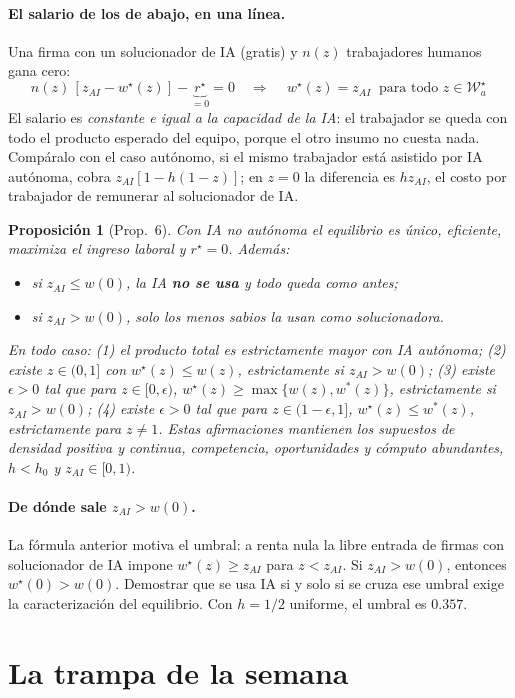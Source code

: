 \documentclass[11pt]{article}
\newtheorem{proposicion}{Proposición}
\theoremstyle{definition}
\theoremstyle{remark}
\newcommand{\zai}{z_{AI}}
\newcommand{\W}{\mathcal W}
\begin{document}
\paragraph{El salario de los de abajo, en una línea.} Una firma con un solucionador de IA (gratis) y
$n(z)$ trabajadores humanos gana cero:
\[
  n(z)\,[\zai-w^{\star}(z)]-\underbrace{r^{\star}}_{=0}=0\quad\Longrightarrow\quad
  \boxed{\,w^{\star}(z)=\zai\ \text{ para todo } z\in\W_a^{\star}\,}
\]
El salario es \emph{constante e igual a la capacidad de la IA}: el trabajador se queda con todo el
producto esperado del equipo, porque el otro insumo no cuesta nada. Compáralo con el caso autónomo,
si el mismo trabajador está asistido por IA autónoma, cobra $\zai[1-h(1-z)]$; en $z=0$ la diferencia
es $h\zai$, el costo por trabajador de remunerar al solucionador de IA.

\begin{proposicion}[Prop.~6]
Con IA no autónoma el equilibrio es único, eficiente, maximiza el ingreso laboral y $r^{\star}=0$. Además:
\begin{itemize}
  \item si $\zai\le w(0)$, la IA \textbf{no se usa} y todo queda como antes;
  \item si $\zai>w(0)$, solo los menos sabios la usan como solucionadora.
\end{itemize}
En todo caso: (1) el producto total es estrictamente mayor con IA autónoma;
(2) existe $z\in(0,1]$ con $w^\star(z)\le w(z)$, estrictamente si $\zai>w(0)$;
(3) existe $\epsilon>0$ tal que para $z\in[0,\epsilon)$,
$w^\star(z)\ge\max\{w(z),w^*(z)\}$, estrictamente si $\zai>w(0)$;
(4) existe $\epsilon>0$ tal que para $z\in(1-\epsilon,1]$,
$w^\star(z)\le w^*(z)$, estrictamente para $z\ne1$. Estas afirmaciones mantienen
los supuestos de densidad positiva y continua, competencia, oportunidades y cómputo abundantes,
$h<h_0$ y $\zai\in[0,1)$.
\end{proposicion}

\paragraph{De dónde sale $\zai>w(0)$.} La fórmula anterior motiva el umbral: a renta nula la libre entrada de firmas con solucionador de IA
impone $w^\star(z)\ge\zai$ para $z<\zai$. Si $\zai>w(0)$, entonces $w^\star(0)>w(0)$.
Demostrar que se usa IA si y solo si se cruza ese umbral exige la caracterización del equilibrio. Con
$h=1/2$ uniforme, el umbral es $0.357$.

\section{La trampa de la semana}
\end{document}
